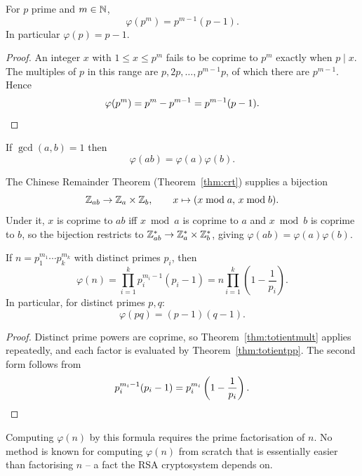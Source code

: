 \documentclass[11pt]{article}
\begin{document}
\begin{theorem}
\label{thm:totientpp}
For $p$ prime and $m\in\mathbb{N}$,
\[
\varphi(p^m)=p^{m-1}(p-1).
\]
In particular $\varphi(p)=p-1$.
\end{theorem}

\begin{proof}
An integer $x$ with $1\le x\le p^m$ fails to be coprime to $p^m$ exactly when $p\mid x$. The multiples of $p$ in this range are $p,2p,\dots,p^{m-1}p$, of which there are $p^{m-1}$. Hence
\[
\varphi(p^m)=p^m-p^{m-1}=p^{m-1}(p-1). \qedhere
\]
\end{proof}

\begin{theorem}[Multiplicativity]
\label{thm:totientmult}
If $\gcd(a,b)=1$ then
\[
\varphi(ab)=\varphi(a)\varphi(b).
\]
\end{theorem}

\begin{note}
The Chinese Remainder Theorem (Theorem~\ref{thm:crt}) supplies a bijection
\[
\mathbb{Z}_{ab}\to\mathbb{Z}_a\times\mathbb{Z}_b, \qquad x\mapsto(x\bmod a,\,x\bmod b).
\]
Under it, $x$ is coprime to $ab$ iff $x\bmod a$ is coprime to $a$ and $x\bmod b$ is coprime to $b$, so the bijection restricts to $\mathbb{Z}_{ab}^*\to\mathbb{Z}_a^*\times\mathbb{Z}_b^*$, giving $\varphi(ab)=\varphi(a)\varphi(b)$.
\end{note}

\begin{theorem}
\label{thm:totientformula}
If $n=p_1^{m_1}\cdots p_k^{m_k}$ with distinct primes $p_i$, then
\[
\varphi(n)=\prod_{i=1}^{k}p_i^{m_i-1}(p_i-1) = n\prod_{i=1}^{k}\left(1-\frac1{p_i}\right).
\]
In particular, for distinct primes $p,q$:
\[
\varphi(pq)=(p-1)(q-1).
\]
\end{theorem}

\begin{proof}
Distinct prime powers are coprime, so Theorem~\ref{thm:totientmult} applies repeatedly, and each factor is evaluated by Theorem~\ref{thm:totientpp}. The second form follows from
\[
p_i^{m_i-1}(p_i-1)=p_i^{m_i}\left(1-\frac1{p_i}\right). \qedhere
\]
\end{proof}

\begin{note}
Computing $\varphi(n)$ by this formula requires the prime factorisation of $n$. No method is known for computing $\varphi(n)$ from scratch that is essentially easier than factorising $n$ -- a fact the RSA cryptosystem depends on.
\end{note}
\end{document}
